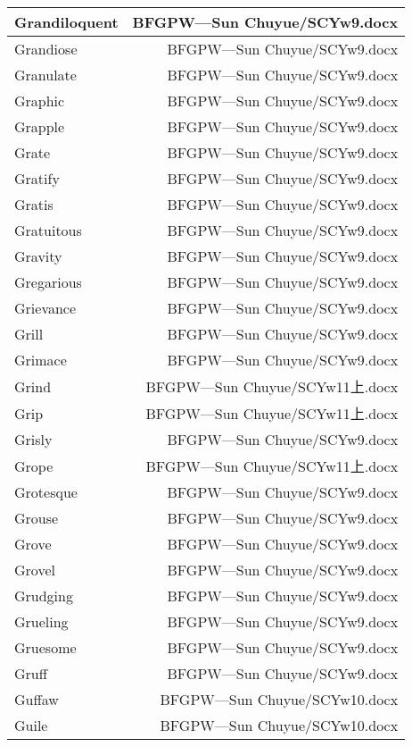 \documentclass{article}
\begin{document}
\begin{center}
\begin{longtable}{|l|r|}
\hline
Grandiloquent  &  BFGPW---Sun Chuyue/SCYw9.docx\\  
\hline
Grandiose  &  BFGPW---Sun Chuyue/SCYw9.docx\\  
\hline
Granulate  &  BFGPW---Sun Chuyue/SCYw9.docx\\  
\hline
Graphic  &  BFGPW---Sun Chuyue/SCYw9.docx\\  
\hline
Grapple  &  BFGPW---Sun Chuyue/SCYw9.docx\\  
\hline
Grate  &  BFGPW---Sun Chuyue/SCYw9.docx\\  
\hline
Gratify  &  BFGPW---Sun Chuyue/SCYw9.docx\\  
\hline
Gratis  &  BFGPW---Sun Chuyue/SCYw9.docx\\  
\hline
Gratuitous  &  BFGPW---Sun Chuyue/SCYw9.docx\\  
\hline
Gravity  &  BFGPW---Sun Chuyue/SCYw9.docx\\  
\hline
Gregarious  &  BFGPW---Sun Chuyue/SCYw9.docx\\  
\hline
Grievance  &  BFGPW---Sun Chuyue/SCYw9.docx\\  
\hline
Grill  &  BFGPW---Sun Chuyue/SCYw9.docx\\  
\hline
Grimace  &  BFGPW---Sun Chuyue/SCYw9.docx\\  
\hline
Grind  &  BFGPW---Sun Chuyue/SCYw11上.docx\\  
\hline
Grip  &  BFGPW---Sun Chuyue/SCYw11上.docx\\  
\hline
Grisly  &  BFGPW---Sun Chuyue/SCYw9.docx\\  
\hline
Grope  &  BFGPW---Sun Chuyue/SCYw11上.docx\\  
\hline
Grotesque  &  BFGPW---Sun Chuyue/SCYw9.docx\\  
\hline
Grouse  &  BFGPW---Sun Chuyue/SCYw9.docx\\  
\hline
Grove  &  BFGPW---Sun Chuyue/SCYw9.docx\\  
\hline
Grovel  &  BFGPW---Sun Chuyue/SCYw9.docx\\  
\hline
Grudging  &  BFGPW---Sun Chuyue/SCYw9.docx\\  
\hline
Grueling  &  BFGPW---Sun Chuyue/SCYw9.docx\\  
\hline
Gruesome  &  BFGPW---Sun Chuyue/SCYw9.docx\\  
\hline
Gruff  &  BFGPW---Sun Chuyue/SCYw9.docx\\  
\hline
Guffaw  &  BFGPW---Sun Chuyue/SCYw10.docx\\  
\hline
Guile  &  BFGPW---Sun Chuyue/SCYw10.docx\\  

\end{longtable}
\end{center}
\end{document}
